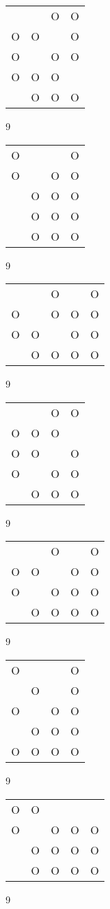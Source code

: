 \begin{tabular}{|m{0.2cm}m{0.2cm}m{0.2cm}m{0.2cm}|}\hline
 & &O&O\\
O&O& &O\\
O& &O&O\\
O&O&O& \\
 &O&O&O\\
\hline\end{tabular}9
\begin{tabular}{|m{0.2cm}m{0.2cm}m{0.2cm}m{0.2cm}|}\hline
O& & &O\\
O& &O&O\\
 &O&O&O\\
 &O&O&O\\
 &O&O&O\\
\hline\end{tabular}9
\begin{tabular}{|m{0.2cm}m{0.2cm}m{0.2cm}m{0.2cm}m{0.2cm}|}\hline
 & &O& &O\\
O& &O&O&O\\
O&O& &O&O\\
 &O&O&O&O\\
\hline\end{tabular}9
\begin{tabular}{|m{0.2cm}m{0.2cm}m{0.2cm}m{0.2cm}|}\hline
 & &O&O\\
O&O&O& \\
O&O& &O\\
O& &O&O\\
 &O&O&O\\
\hline\end{tabular}9
\begin{tabular}{|m{0.2cm}m{0.2cm}m{0.2cm}m{0.2cm}m{0.2cm}|}\hline
 & &O& &O\\
O&O& &O&O\\
O& &O&O&O\\
 &O&O&O&O\\
\hline\end{tabular}9
\begin{tabular}{|m{0.2cm}m{0.2cm}m{0.2cm}m{0.2cm}|}\hline
O& & &O\\
 &O& &O\\
O& &O&O\\
 &O&O&O\\
O&O&O&O\\
\hline\end{tabular}9
\begin{tabular}{|m{0.2cm}m{0.2cm}m{0.2cm}m{0.2cm}m{0.2cm}|}\hline
O&O& & & \\
O& &O&O&O\\
 &O&O&O&O\\
 &O&O&O&O\\
\hline\end{tabular}9
